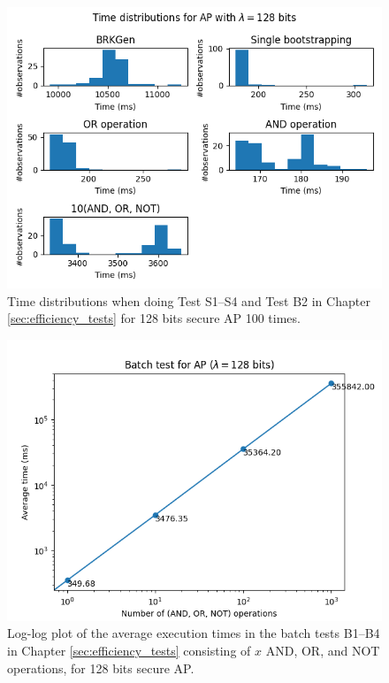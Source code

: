 \begin{figure}[ht]
    \centering
    \includegraphics[width=\textwidth]{data/figures/AP_STD128_distributions.png}
    \caption{Time distributions when doing Test S1--S4 and Test B2 in Chapter \ref{sec:efficiency_tests} for 128 bits secure AP 100 times.}
    \label{fig:distr_ap128}
\end{figure}

\begin{figure}[ht]
    \centering
    \includegraphics[width=0.8\linewidth]{data/figures/AP_STD128_batch.png}
    \caption{Log-log plot of the average execution times in the batch tests B1--B4 in Chapter \ref{sec:efficiency_tests} consisting of $x$ AND, OR, and NOT operations, for 128 bits secure AP.}
    \label{fig:batch_ap128}
\end{figure}

